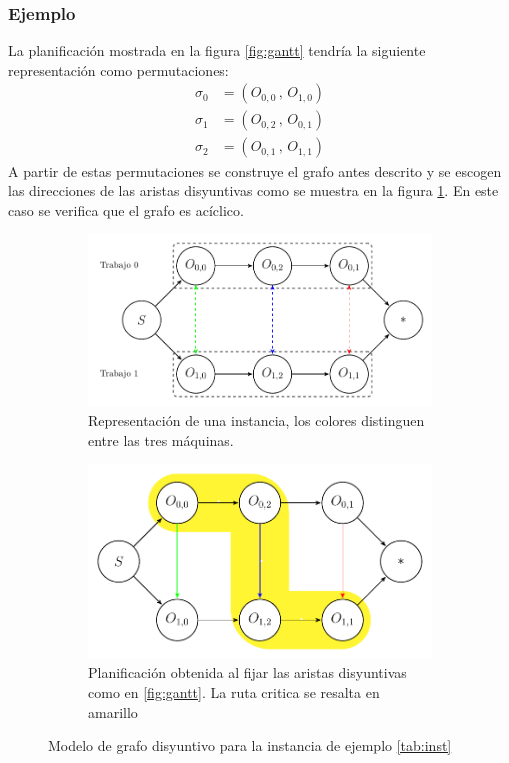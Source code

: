 \subsubsection*{Ejemplo}
La planificación mostrada en la figura \ref{fig:gantt} tendría la siguiente representación como permutaciones:
\begin{align*}
\sigma_0 &= (O_{0,0}\,,\,O_{1,0})\\
\sigma_1 &= (O_{0,2}\,,\,O_{0,1})\\
\sigma_2 &= (O_{0,1}\,,\,O_{1,1})
\end{align*}
A partir de estas permutaciones se construye el grafo antes descrito y se escogen las direcciones de las aristas disyuntivas como se muestra en la figura \ref{fig:dgraph}. En este caso se verifica que el grafo es acíclico. 
\begin{figure}[h]
    \centering
    \begin{subfigure}{.8\textwidth}
        \centering
        \includegraphics[width=.8\linewidth]{Imagenes/disyuntive.pdf}
        \caption{Representación de una instancia, los colores distinguen entre las tres máquinas.}
    \end{subfigure}
    \begin{subfigure}{.8\textwidth}
        \centering
        \includegraphics[width=.8\linewidth]{Imagenes/plandisyuntive.pdf}
        \caption{Planificación obtenida al fijar las aristas disyuntivas como en \ref{fig:gantt}. La ruta critica se resalta en amarillo}
    \end{subfigure}
\caption{Modelo de grafo disyuntivo para la instancia de ejemplo \ref{tab:inst}}
        \label{fig:dgraph}
\end{figure}

